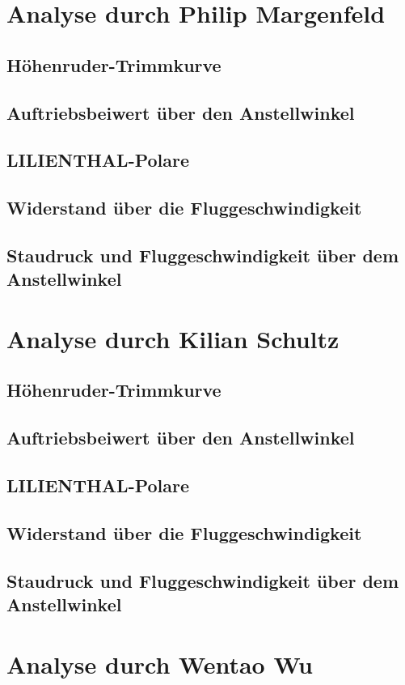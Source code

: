 \section{Analyse durch Philip Margenfeld}
\subsection{Höhenruder-Trimmkurve}
\subsection{Auftriebsbeiwert über den Anstellwinkel}
\subsection{LILIENTHAL-Polare}
\subsection{Widerstand über die Fluggeschwindigkeit}
\subsection{Staudruck und Fluggeschwindigkeit über dem Anstellwinkel}
\newpage
\section{Analyse durch Kilian Schultz}
	\subsection{Höhenruder-Trimmkurve}
	\subsection{Auftriebsbeiwert über den Anstellwinkel}
	\subsection{LILIENTHAL-Polare}
	\subsection{Widerstand über die Fluggeschwindigkeit}
	\subsection{Staudruck und Fluggeschwindigkeit über dem Anstellwinkel}
	\newpage
	\section{Analyse durch Wentao Wu}
